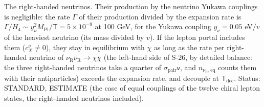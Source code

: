 \documentclass[
  10pt,
]{article}
\begin{document}
The right-handed neutrinos. Their production by the neutrino Yukawa
couplings is negligible: the rate \(\Gamma\) of their production divided
by the expansion rate is
\(\Gamma/H_4 \sim y_\nu^2M_{\mathrm{Pl}}/\mathsf{T} = 5\times10^{-9}\)
at 100 GeV, for the Yukawa coupling \(y_\nu = 0.05\) eV\(/v\) of the
heaviest neutrino (its mass divided by \(v\)). If the lepton portal
includes them (\(c^{\nu}_X \ne 0\)), they stay in equilibrium with
\(\chi\) as long as the rate per right-handed neutrino of
\(\nu_{\mathrm{R}}\bar\nu_{\mathrm{R}} \to \chi\bar\chi\) (the left-hand
side of S-26, by detailed balance: the three right-handed neutrinos take
a quarter of \(\sigma_{\mathrm{pair}}\mathsf{v}\), and
\(n_{\nu_{\mathrm{R}},\mathrm{eq}}\) counts them with their
antiparticles) exceeds the expansion rate, and decouple at
\(\mathsf{T}_{\mathrm{dec}}\). Status: STANDARD, ESTIMATE (the case of
equal couplings of the twelve chiral lepton states, the right-handed
neutrinos included).
\end{document}
